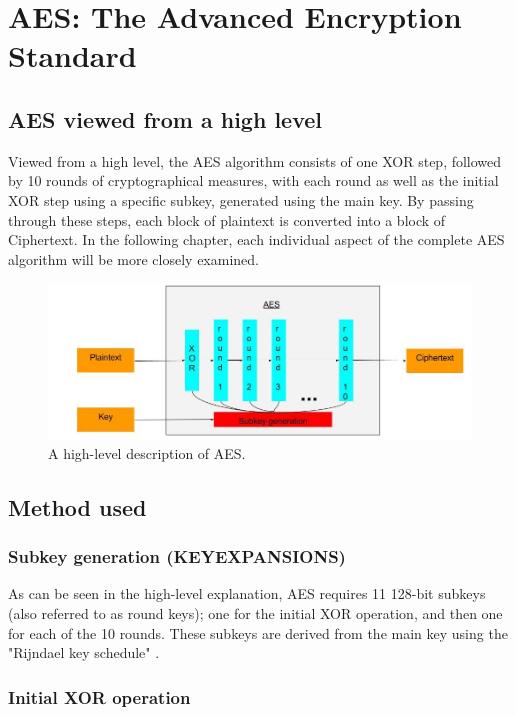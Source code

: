 \documentclass[12pt]{report}
\begin{document}
\chapter{AES: The Advanced Encryption Standard}

\section{AES viewed from a high level}

Viewed from a high level, the AES algorithm consists of one XOR step, followed by 10 rounds of cryptographical measures, with each round as well as the initial XOR step using a specific subkey, generated using the main key. By passing through these steps, each block of plaintext is converted into a block of Ciphertext. In the following chapter, each individual aspect of the complete AES algorithm will be more closely examined.

\begin{figure}[H]
\centering
\includegraphics[scale=0.4]{AES_fig1.jpg}
\caption{A high-level description of AES.}
\end{figure}

\section{Method used}

\subsection{Subkey generation (KEYEXPANSIONS)}
As can be seen in the high-level explanation, AES requires 11 128-bit subkeys (also referred to as round keys); one for the initial XOR operation, and then one for each of the 10 rounds. These subkeys are derived from the main key using the "Rijndael key schedule" \cite{KeySchedule}.

\subsection{Initial XOR operation}
\end{document}
